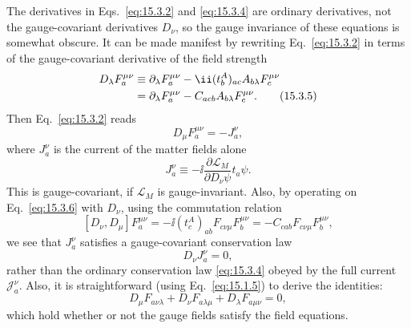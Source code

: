 The derivatives in Eqs.~\eqref{eq:15.3.2} and \eqref{eq:15.3.4} are ordinary
derivatives, not the gauge-covariant derivatives $D_\nu$, so the gauge invariance
of these equations is somewhat obscure. It can be made manifest by rewriting
Eq.~\eqref{eq:15.3.2} in terms of the gauge-covariant derivative of the field
strength
\begin{align}
 D_\lambda F_a^{\mu\nu}
 &\equiv\partial_\lambda F_a^{\mu\nu}
 -\ii(t^A_b)_{ac}A_{b\lambda}F_c^{\mu\nu}\notag\\
 &=\partial_\lambda F_a^{\mu\nu}
 -C_{acb}A_{b\lambda}F_c^{\mu\nu} .
 \tag{15.3.5}\label{eq:15.3.5}
\end{align}
Then Eq.~\eqref{eq:15.3.2} reads
\begin{equation}
 D_\mu F_a^{\mu\nu}=-J_a^\nu ,
 \tag{15.3.6}\label{eq:15.3.6}
\end{equation}
where $J_a^\nu$ is the current of the matter fields alone
\begin{equation}
 J_a^\nu\equiv-\ii\frac{\partial\mathcal L_M}{\partial D_\nu\psi}
 t_a\psi .
 \tag{15.3.7}\label{eq:15.3.7}
\end{equation}
This is gauge-covariant, if $\mathcal L_M$ is gauge-invariant. Also, by operating
on Eq.~\eqref{eq:15.3.6} with $D_\nu$, using the commutation relation
\[
 [D_\nu,D_\mu]F_a^{\mu\nu}
 =-\ii(t^A_c)_{ab}F_{c\nu\mu}F_b^{\mu\nu}
 =-C_{cab}F_{c\nu\mu}F_b^{\mu\nu} ,
\]
we see that $J_a^\nu$ satisfies a gauge-covariant conservation law
\begin{equation}
 D_\nu J_a^\nu=0 ,
 \tag{15.3.8}\label{eq:15.3.8}
\end{equation}
rather than the ordinary conservation law \eqref{eq:15.3.4} obeyed by the full
current $\mathcal J_a^\nu$. Also, it is straightforward (using
Eq.~\eqref{eq:15.1.5}) to derive the identities:
\begin{equation}
 D_\mu F_{a\nu\lambda}+D_\nu F_{a\lambda\mu}
 +D_\lambda F_{a\mu\nu}=0 ,
 \tag{15.3.9}\label{eq:15.3.9}
\end{equation}
which hold whether or not the gauge fields satisfy the field equations.

